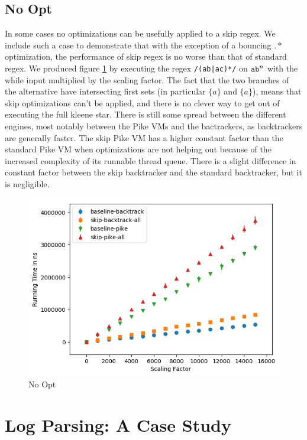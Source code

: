 \subsection{No Opt}
\label{section:noopt}

In some cases no optimizations can be usefully applied to a skip
regex. We include such a case to demonstrate that with the exception
of a bouncing $.*$ optimization, the performance of skip regex is
no worse than that of standard regex. We produced figure 
\ref{fig:justtwo:branch}
by executing the regex \verb'/(ab|ac)*/' on ${\tt ab}^n$ with
the while input multiplied by the scaling factor. The fact that the
two branches of the alternative have intersecting first sets
(in particular $\{a\}$ and $\{a\}$), means that skip optimizations
can't be applied, and there is no clever way to get out of
executing the full kleene star. There is still some spread between
the different engines, most notably between the Pike VMs and the
bactrackers, as backtrackers are generally faster. The skip Pike VM
has a higher constant factor than the standard Pike VM when optimizations
are not helping out because of the increased complexity of its runnable
thread queue. There is a slight difference in constant factor between
the skip backtracker and the standard backtracker, but it is negligible.

\begin{figure}
\caption{No Opt}
\label{fig:justtwo:branch}

\includegraphics{resources/no-opt.png}
\end{figure}

\section{Log Parsing: A Case Study}
\label{section:logparsingcase}

